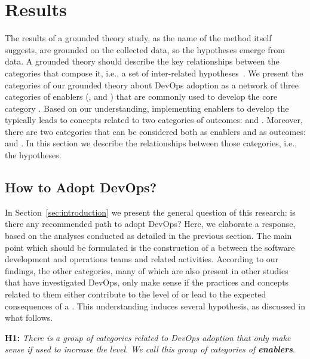 \section{Results} \label{sec:results}

The results of a grounded theory study, as the name of the method itself
suggests, are grounded on the collected data, so the hypotheses emerge from
data. A grounded theory should describe the key relationships between the
categories that compose it, i.e., a set of inter-related hypotheses~\cite{hoda2017becoming}.
We present the categories of our grounded theory
about DevOps adoption as a network of three categories of enablers (,
 and ) that are commonly used to develop the core category
. Based on our understanding, implementing enablers to develop the  typically leads to concepts related to two categories of outcomes:
 and . Moreover, there are two categories that can be considered
both as enablers and as outcomes:  and .
In this section we describe the relationships between those categories, i.e.,
the hypotheses.

\subsection{How to Adopt DevOps?}

In Section~\ref{sec:introduction} we present the general question of this
research: is there any recommended path to adopt DevOps? Here, we elaborate a response,
based on the analyses conducted as detailed in the previous section. The main
point which should be formulated is the construction of a  between the software development and operations teams and
related activities. According to our findings, the other categories,
many of which are also present in other studies that have investigated DevOps,
only make sense if the practices and
concepts related to them either contribute to the level of  or lead to the expected consequences of a . This understanding induces several hypothesis, as discussed in
what follows.

\begin{mh}
\textbf{H1:} \textit{There is a group of categories related to DevOps adoption
that only make sense if used to increase the}  \emph{level. We
call this group of categories of \textbf{enablers}}.
\end{mh}

